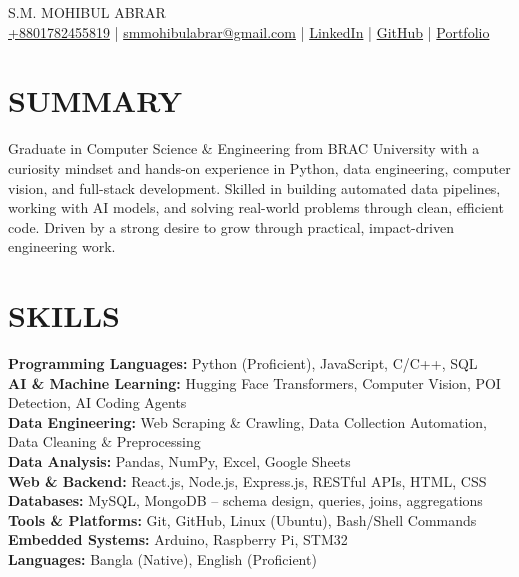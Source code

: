 \documentclass[a4paper,11pt]{article}
\begin{document}
\begin{center}
    {\Huge S.M. MOHIBUL ABRAR} \\ \vspace{5pt}
    {\small
    \href{https://sm-mohibul-abrar.github.io/contact.html?action=phone}{+8801782455819} \;|\;
    \href{https://sm-mohibul-abrar.github.io/contact.html?action=email}{smmohibulabrar@gmail.com} \;|\;
    \href{https://www.linkedin.com/in/sm-mohibul-abrar/}{LinkedIn} \;|\;
    \href{https://github.com/sm-mohibul-abrar}{GitHub} \;|\;
    \href{https://sm-mohibul-abrar.github.io}{Portfolio}
    }
\end{center}

\section{SUMMARY}
Graduate in Computer Science \& Engineering from BRAC University with a curiosity mindset and hands-on experience in Python, data engineering, computer vision, and full-stack development. Skilled in building automated data pipelines, working with AI models, and solving real-world problems through clean, efficient code. Driven by a strong desire to grow through practical, impact-driven engineering work.

\section{SKILLS}
\textbf{Programming Languages:} Python (Proficient), JavaScript, C/C++, SQL \\
\textbf{AI \& Machine Learning:} Hugging Face Transformers, Computer Vision, POI Detection, AI Coding Agents \\
\textbf{Data Engineering:} Web Scraping \& Crawling, Data Collection Automation, Data Cleaning \& Preprocessing \\
\textbf{Data Analysis:} Pandas, NumPy, Excel, Google Sheets \\
\textbf{Web \& Backend:} React.js, Node.js, Express.js, RESTful APIs, HTML, CSS \\
\textbf{Databases:} MySQL, MongoDB -- schema design, queries, joins, aggregations \\
\textbf{Tools \& Platforms:} Git, GitHub, Linux (Ubuntu), Bash/Shell Commands \\
\textbf{Embedded Systems:} Arduino, Raspberry Pi, STM32 \\
\textbf{Languages:} Bangla (Native), English (Proficient)
\end{document}
